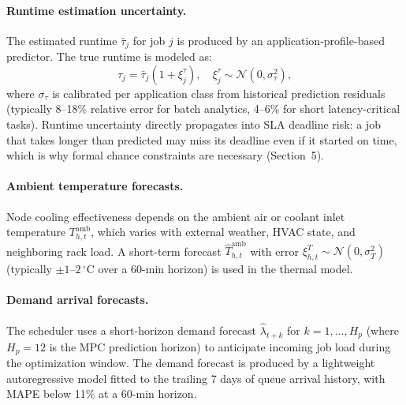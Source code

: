 \documentclass[a4paper,fleqn]{cas-dc}
\begin{document}
\paragraph{Runtime estimation uncertainty.}
The estimated runtime $\bar{\tau}_j$ for job $j$ is produced by an application-profile-based predictor. The true runtime is modeled as:
\begin{equation}
\tau_j = \bar{\tau}_j (1 + \xi^{\tau}_j), \quad \xi^{\tau}_j \sim \mathcal{N}(0, \sigma^2_\tau),
\end{equation}
where $\sigma_\tau$ is calibrated per application class from historical prediction residuals (typically 8--18\% relative error for batch analytics, 4--6\% for short latency-critical tasks). Runtime uncertainty directly propagates into SLA deadline risk: a job that takes longer than predicted may miss its deadline even if it started on time, which is why formal chance constraints are necessary (Section~5).

\paragraph{Ambient temperature forecasts.}
Node cooling effectiveness depends on the ambient air or coolant inlet temperature $T^{\mathrm{amb}}_{h,t}$, which varies with external weather, HVAC state, and neighboring rack load. A short-term forecast $\hat{T}^{\mathrm{amb}}_{h,t}$ with error $\xi^T_{h,t} \sim \mathcal{N}(0, \sigma^2_{T})$ (typically $\pm 1$--$2\,^{\circ}$C over a 60-min horizon) is used in the thermal model.

\paragraph{Demand arrival forecasts.}
The scheduler uses a short-horizon demand forecast $\hat{\lambda}_{t+k}$ for $k = 1, \ldots, H_p$ (where $H_p = 12$ is the MPC prediction horizon) to anticipate incoming job load during the optimization window. The demand forecast is produced by a lightweight autoregressive model fitted to the trailing 7 days of queue arrival history, with MAPE below 11\% at a 60-min horizon.
\end{document}
